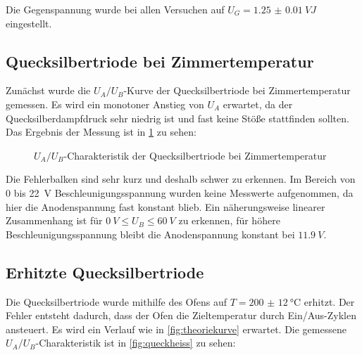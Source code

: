 Die Gegenspannung wurde bei allen Versuchen auf $U_G=\SI{1.25(1)}{V}J$ eingestellt.

\subsection{Quecksilbertriode bei Zimmertemperatur}
 Zunächst wurde die $U_A/U_B$-Kurve der Quecksilbertriode bei Zimmertemperatur gemessen. Es wird ein monotoner Anstieg von $U_A$ erwartet, da der Quecksilberdampfdruck sehr niedrig ist und fast keine Stöße stattfinden sollten. Das Ergebnis der Messung ist in \cref{fig:zimmertemp} zu sehen:
\begin{figure}[H]
\centering
{}
\caption{$U_A/U_B$-Charakteristik der Quecksilbertriode bei Zimmertemperatur}
\label{fig:zimmertemp}
\end{figure}
Die Fehlerbalken sind sehr kurz und deshalb schwer zu erkennen.
Im Bereich von 0 bis \SI{22}{V} Beschleunigungsspannung wurden keine Messwerte aufgenommen, da hier die Anodenspannung fast konstant blieb. Ein näherungsweise linearer Zusammenhang ist für $\SI{0}{V}\leq U_B\leq \SI{60}{V}$ zu erkennen, für höhere Beschleunigungsspannung bleibt die Anodenspannung konstant bei $\SI{11.9}{V}$.

\subsection{Erhitzte Quecksilbertriode}
Die Quecksilbertriode wurde mithilfe des Ofens auf $T=\SI{200(12)}{\degreeCelsius}$ erhitzt. Der Fehler entsteht dadurch, dass der Ofen die Zieltemperatur durch Ein/Aus-Zyklen ansteuert. Es wird ein Verlauf wie in \cref{fig:theoriekurve} erwartet. Die gemessene $U_A/U_B$-Charakteristik ist in \cref{fig:queckheiss} zu sehen:

